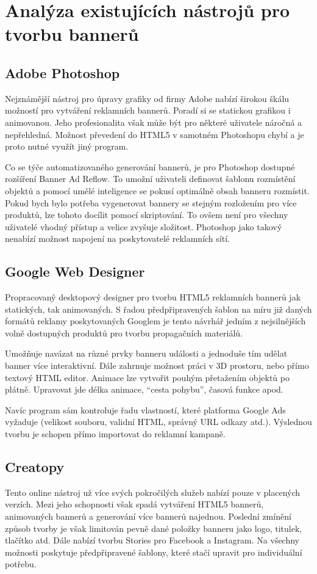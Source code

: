 \chapter{Analýza existujících nástrojů pro tvorbu bannerů}
\label{chap:analysis}

\section{Adobe Photoshop}
Nejznámější nástroj pro úpravy grafiky od firmy Adobe nabízí širokou škálu možností pro vytváření reklamních bannerů.
Poradí si se statickou grafikou i animovanou. Jeho profesionalita však může být pro některé uživatele náročná a nepřehledná.
Možnost převedení do HTML5 v samotném Photoshopu chybí a je proto nutné využít jiný program.

Co se týče automatizovaného generování bannerů, je pro Photoshop dostupné rozšíření Banner Ad Reflow.
To umožní uživateli definovat šablonu rozmístění objektů a pomocí umělé inteligence se pokusí optimálně obsah banneru rozmístit.
Pokud bych bylo potřeba vygenerovat bannery se stejným rozložením pro více produktů, lze tohoto docílit pomocí skriptování.
To ovšem není pro všechny uživatelé vhodný přístup a velice zvyšuje složitost. Photoshop jako takový nenabízí možnost napojení na poskytovatelé reklamních sítí.

\section{Google Web Designer}
Propracovaný desktopový designer pro tvorbu HTML5 reklamních bannerů jak statických, tak animovaných.
S řadou předpřipravených šablon na míru již daných formátů reklamy poskytovaných Googlem je tento návrhář jedním z nejsilnějších
volně dostupných produktů pro tvorbu propagačních materiálů.

Umožňuje navázat na různé prvky banneru události a jednoduše tím udělat banner více interaktivní.
Dále zahrnuje možnost práci v 3D prostoru, nebo přímo textový HTML editor.
Animace lze vytvořit pouhým přetažením objektů po plátně. Upravovat jde délka animace, \enquote{cesta pohybu}, časová funkce apod. 

Navíc program sám kontroluje řadu vlastností, které platforma Google Ads vyžaduje
(velikost souboru, validní HTML, správný URL odkazy atd.). Výslednou tvorbu je schopen přímo importovat do reklamní kampaně.

\section{Creatopy}
Tento online nástroj už více svých pokročilých služeb nabízí pouze v placených verzích. Mezi jeho schopnosti však spadá vytváření HTML5 bannerů,
animovaných bannerů a generování více bannerů najednou. Poslední zmínění způsob tvorby je však limitován pevně dané položky banneru jako logo, titulek,
tlačítko atd. Dále nabízí tvorbu Stories pro Facebook a Instagram. Na všechny možnosti poskytuje předpřipravené šablony,
které stačí upravit pro individuální potřebu.

